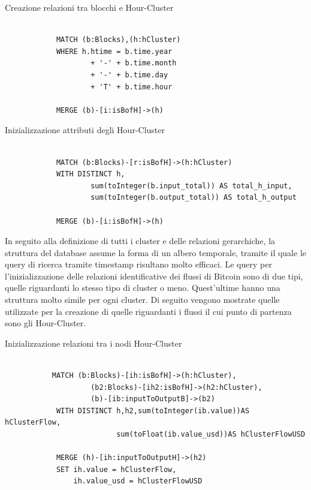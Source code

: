 \vspace{5mm}
\begin{center}
Creazione relazioni tra blocchi e Hour-Cluster
\begin{lstlisting}

            MATCH (b:Blocks),(h:hCluster)  
            WHERE h.htime = b.time.year 
                    + '-' + b.time.month
                    + '-' + b.time.day 
                    + 'T' + b.time.hour
                    
            MERGE (b)-[i:isBofH]->(h)
\end{lstlisting} 
\end{center}
\vspace{2mm}
\begin{center}
Inizializzazione attributi degli Hour-Cluster
\begin{lstlisting}

            MATCH (b:Blocks)-[r:isBofH]->(h:hCluster) 
            WITH DISTINCT h,
                    sum(toInteger(b.input_total)) AS total_h_input,
                    sum(toInteger(b.output_total)) AS total_h_output

            MERGE (b)-[i:isBofH]->(h)
\end{lstlisting} 
\end{center}
\newpage \thispagestyle{mystyle}
In seguito alla definizione di tutti i cluster e delle relazioni gerarchiche, la struttura del database assume la forma di un albero temporale, tramite il quale le query di ricerca tramite timestamp risultano molto efficaci.
Le query per l'inizializzazione delle relazioni identificative dei flussi di Bitcoin sono di due tipi, quelle riguardanti lo stesso tipo di cluster o meno.
Quest'ultime hanno una struttura molto simile per ogni cluster.
Di seguito vengono mostrate quelle utilizzate per la creazione di quelle riguardanti i flussi il cui punto di partenza sono gli Hour-Cluster.
\vspace{5mm}
\begin{center}
Inizializzazione relazioni tra i nodi Hour-Cluster
\begin{lstlisting}

           MATCH (b:Blocks)-[ih:isBofH]->(h:hCluster),
                    (b2:Blocks)-[ih2:isBofH]->(h2:hCluster), 
                    (b)-[ib:inputToOutputB]->(b2)
            WITH DISTINCT h,h2,sum(toInteger(ib.value))AS hClusterFlow, 
                          sum(toFloat(ib.value_usd))AS hClusterFlowUSD
                          
            MERGE (h)-[ih:inputToOutputH]->(h2)
            SET ih.value = hClusterFlow,
                ih.value_usd = hClusterFlowUSD

\end{lstlisting} 
\end{center}

